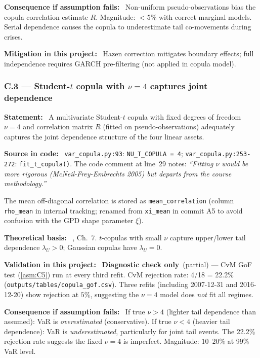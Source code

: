 \documentclass[11pt,a4paper]{article}
\newcommand{\asmfield}[1]{\medskip\noindent\textbf{#1:}\ }
\newcommand{\code}[1]{\texttt{#1}}
\newcommand{\diagnostic}{\textbf{Diagnostic check only}}
\begin{document}
\asmfield{Consequence if assumption fails}
Non-uniform pseudo-observations bias the copula correlation estimate $R$.
Magnitude: $< 5\%$ with correct marginal models. Serial dependence causes
the copula to underestimate tail co-movements during crises.

\asmfield{Mitigation in this project}
Hazen correction mitigates boundary effects; full independence requires
GARCH pre-filtering (not applied in copula model).

\subsubsection{C.3 --- Student-$t$ copula with $\nu = 4$ captures joint dependence}\label{asm:C3}

\asmfield{Statement}
A multivariate Student-$t$ copula with fixed degrees of freedom $\nu = 4$
and correlation matrix $R$ (fitted on pseudo-observations) adequately
captures the joint dependence structure of the four linear assets.

\asmfield{Source in code}
\code{var\_copula.py:93}: \lstinline|NU_T_COPULA = 4|;
\code{var\_copula.py:253-272}: \code{fit\_t\_copula()}.
The code comment at line~29 notes: \emph{``Fitting $\nu$ would be more
rigorous (McNeil-Frey-Embrechts 2005) but departs from the course
methodology.''}

The mean off-diagonal correlation is stored as \code{mean\_correlation}
(column \code{rho\_mean} in internal tracking; renamed from \code{xi\_mean}
in commit A5 to avoid confusion with the GPD shape parameter $\xi$).

\asmfield{Theoretical basis}
\cite{McNeilFreyEmbrechts2005}, Ch.~7. $t$-copulas with small $\nu$ capture
upper/lower tail dependence $\lambda_U > 0$; Gaussian copulas have
$\lambda_U = 0$.

\asmfield{Validation in this project}
\diagnostic\ (partial) --- CvM GoF test (\cref{asm:C5}) run at every third
refit. CvM rejection rate: 4/18 = 22.2\% (\code{outputs/tables/copula\_gof.csv}).
Three refits (including 2007-12-31 and 2016-12-20) show rejection at $5\%$,
suggesting the $\nu = 4$ model does \emph{not} fit all regimes.

\asmfield{Consequence if assumption fails}
If true $\nu > 4$ (lighter tail dependence than assumed): VaR is
\emph{overestimated} (conservative). If true $\nu < 4$ (heavier tail
dependence): VaR is \emph{underestimated}, particularly for joint tail
events. The 22.2\% rejection rate suggests the fixed $\nu = 4$ is
imperfect. Magnitude: $10$--$20\%$ at 99\% VaR level.
\end{document}
